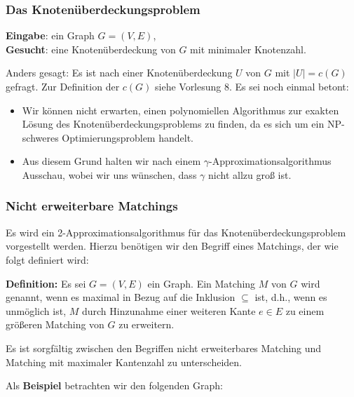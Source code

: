 \documentclass[smaller]{beamer}
\begin{document}
\begin{frame}
\frametitle{Das Knotenüberdeckungsproblem}
\textbf{Eingabe}: ein Graph $G=(V,E)$, \\ \vspace*{0.2cm}
\textbf{Gesucht}: eine Knotenüberdeckung von $G$ mit minimaler Knotenzahl. \\ \vspace*{0.2cm}

Anders gesagt: Es ist nach einer Knotenüberdeckung $U$ von $G$ mit $|U| = c(G)$ gefragt. Zur Definition der  $c(G)$ siehe Vorlesung 8. Es sei noch einmal betont:
\begin{itemize}
\item Wir können nicht erwarten, einen polynomiellen Algorithmus zur exakten Lösung des Knotenüberdeckungsproblems zu finden, da es sich um ein NP-schweres Optimierungsproblem handelt.
\item Aus diesem Grund halten wir nach einem $\gamma$-Approximationsalgorithmus Ausschau, wobei wir uns wünschen, dass $\gamma$ {\glqq}nicht allzu groß{\grqq} ist.
\end{itemize}
\end{frame}

\begin{frame}
\frametitle{Nicht erweiterbare Matchings}
Es wird ein 2-Approximationsalgorithmus für das Knotenüberdeckungsproblem vorgestellt werden. Hierzu benötigen wir den Begriff eines  Matchings, der wie folgt definiert wird: \\ \vspace*{0.2cm}

\textbf{Definition:} Es sei $G=(V,E)$ ein Graph. Ein Matching $M$ von $G$ wird  genannt, wenn es maximal in Bezug auf die Inklusion $\subseteq$ ist, d.h., wenn es unmöglich ist, $M$ durch Hinzunahme einer weiteren Kante $e \in E$ zu einem größeren Matching von $G$ zu erweitern. \\ \vspace*{0.2cm}

Es ist sorgfältig zwischen den Begriffen \alert{nicht erweiterbares Matching} und \alert{Matching mit maximaler Kantenzahl} zu unterscheiden. \\ \vspace*{0.2cm}

Als \textbf{Beispiel} betrachten wir den folgenden Graph:
\end{frame}
\end{document}
